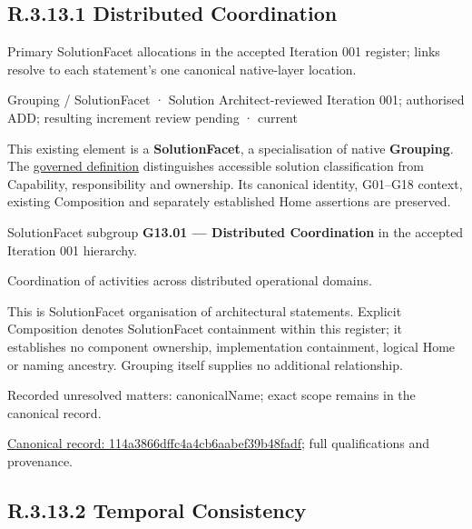 \subsection*{R.3.13.1 Distributed Coordination}
\label{navigation:R.3.13.1}

Primary SolutionFacet allocations in the accepted Iteration 001 register; links resolve to each statement’s one canonical native-layer location.\par
\label{element:114a3866dffc4a4cb6aabef39b48fadf}
{\small Grouping / SolutionFacet · Solution Architect-reviewed Iteration 001; authorised ADD; resulting increment review pending · current}\par

This existing element is a \textbf{SolutionFacet}, a specialisation of native
\textbf{Grouping}. The \href{\detokenize{../../../../../../../governance/continuum-representation.md#solutionfacet-classification--1119-candidate}}{governed definition}
distinguishes accessible solution classification from Capability, responsibility
and ownership. Its canonical identity, G01–G18 context, existing Composition
and separately established Home assertions are preserved.



SolutionFacet subgroup \textbf{G13.01 — Distributed Coordination} in the accepted Iteration 001 hierarchy.



Coordination of activities across distributed operational domains.



This is SolutionFacet organisation of architectural statements. Explicit Composition denotes SolutionFacet containment within this register; it establishes no component ownership, implementation containment, logical Home or naming ancestry. Grouping itself supplies no additional relationship.


{\small Recorded unresolved matters: canonicalName; exact scope remains in the canonical record.}\par
{\footnotesize \href{../../../../../../../continuum/grouping/114a3866dffc4a4cb6aabef39b48fadf.md}{Canonical record: 114a3866dffc4a4cb6aabef39b48fadf}; full qualifications and provenance.}\par
\subsection*{R.3.13.2 Temporal Consistency}
\label{navigation:R.3.13.2}

